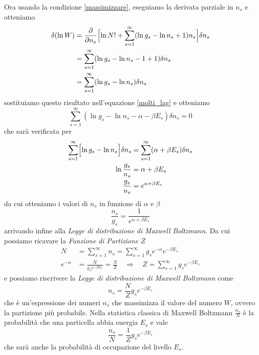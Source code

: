 Ora usando la condizione \ref{massimizzare}, eseguiamo la derivata parziale in $n_s$ e otteniamo
\begin{equation}
\begin{split}
\delta (\ln W) & = \frac{ \partial}{\partial n_s } \Bigl[ \ln N! + \sum_{s=1}^{\infty} (\ln g_s - \ln n_s + 1) n_s \Bigr]  \delta n_s \\
& = \sum_{s=1}^{\infty} (\ln g_s - \ln n_s - 1 + 1) \delta n_s \\
& = \sum_{s=1}^{\infty} (\ln g_s - \ln n_s ) \delta n_s
\end{split}
\end{equation}
sostituiamo questo risultato nell'equazione \ref{molti_lag} e otteniamo
\begin{equation}
\sum_{s=1}^{\infty} (\ln g_s - \ln n_s - \alpha - \beta E_s) \delta n_s = 0 
\end{equation}
che sarà verificata per
\begin{equation}
\begin{split}
\sum_{s=1}^{\infty} \Bigl[ \ln g_s - \ln n_s  \Bigr]\delta n_s & = \sum_{s=1}^{\infty} ( \alpha + \beta E_s) \delta n_s \\
\ln \frac{ g_s}{n_s } & = \alpha + \beta E_s \\
\frac{ g_s}{n_s } & = e^{ \alpha + \beta E_s } 
\end{split}
\end{equation}
da cui otteniamo i valori di $n_s$ in funzione di $\alpha$ e $\beta$
\begin{equation}
\frac{ n_s}{g_s } = \frac{ 1}{ e^{ \alpha + \beta E_s }  }
\label{dist_MB}
\end{equation}
arrivando infine alla \textit{Legge di distribuzione di Maxwell Boltzmann}.
Da cui possiamo ricavare la \textit{Funzione di Partizione} $Z$
\begin{equation}
\begin{split}
N & = \sum_{s=1}^{\infty} n_s = \sum_{s=1}^{\infty} g_s e^{ -\alpha } e^{ -\beta E_s } \\
e^{ -\alpha } & = \frac{ N}{ g_s  e^{ -\beta E_s }} = \frac{ N}{Z } \quad\Rightarrow\quad  Z =  \sum_{s=1}^{\infty} g_s e^{ -\beta E_s }
\end{split}
\end{equation}
e possiamo riscrivere la \textit{Legge di distribuzione di Maxwell Boltzmann} come
\begin{equation}
n_s = \frac{ N}{Z } g_s e^{ -\beta E_s }
\end{equation}
che è un'espressione dei numeri $n_s$ che massimizza il valore del numero $W$, ovvero la partizione più probabile.
Nella statistica classica di Maxwell Boltzmann $\frac{ n_s}{N }$ è la probabilità che una particella abbia energia $E_s$ e vale
\begin{equation}
\frac{ n_s }{N } = \frac{ 1}{Z } g_s e^{ -\beta E_s }
\end{equation}
che sarà anche la probabilità di occupazione del livello $E_s$.


